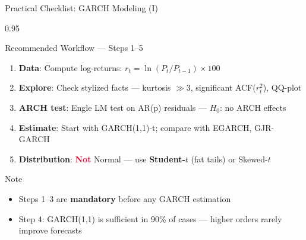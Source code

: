 \documentclass[9pt, aspectratio=169, t]{beamer}
\begin{document}
\begin{frame}{Practical Checklist: GARCH Modeling (I)}
    \begin{cminipage}{0.95\textwidth}
    {\footnotesize
        \begin{block}{Recommended Workflow --- Steps 1--5}
            \begin{enumerate}\setlength{\itemsep}{1pt}
                \item \textbf{Data}: Compute log-returns: $r_t = \ln(P_t / P_{t-1}) \times 100$
                \item \textbf{Explore}: Check stylized facts --- kurtosis $\gg 3$, significant ACF($r_t^2$), QQ-plot
                \item \textbf{ARCH test}: Engle LM test on AR(p) residuals --- $H_0$: no ARCH effects
                \item \textbf{Estimate}: Start with GARCH(1,1)-t; compare with EGARCH, GJR-GARCH
                \item \textbf{Distribution}: \textcolor{Crimson}{\textbf{Not}} Normal --- use \textbf{Student-$t$} (fat tails) or Skewed-$t$
            \end{enumerate}
        \end{block}
        \vspace{0.1cm}
        \begin{alertblock}{Note}
            \begin{itemize}\setlength{\itemsep}{0pt}
                \item Steps 1--3 are \textbf{mandatory} before any GARCH estimation
                \item Step 4: GARCH(1,1) is sufficient in 90\% of cases --- higher orders rarely improve forecasts
            \end{itemize}
        \end{alertblock}
    }
    \end{cminipage}
\end{frame}
\end{document}
